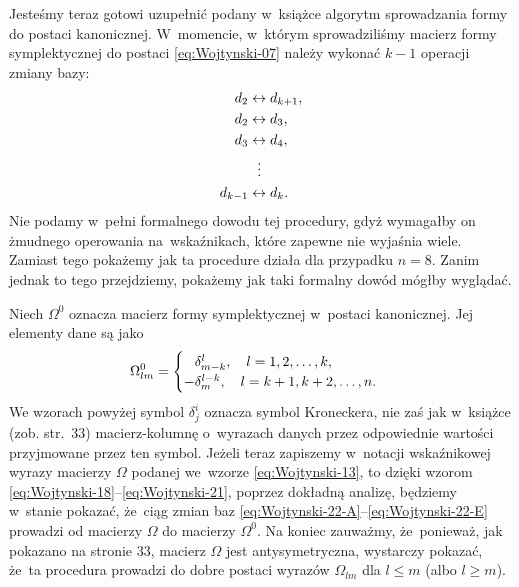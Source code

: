 \documentclass[a4paper,11pt]{article}
\numberwithin{equation}{section}
\begin{document}
Jesteśmy teraz gotowi uzupełnić podany w~książce algorytm sprowadzania
formy do postaci kanonicznej. W~momencie, w~którym sprowadziliśmy macierz
formy symplektycznej do postaci \eqref{eq:Wojtynski-07} należy wykonać
$k - 1$ operacji zmiany bazy:
\begin{subequations}
  \begin{align}
    \label{eq:Wojtynski-22-A}
    d_{ 2 } &\leftrightarrow d_{ k + 1 }, \\
    \label{eq:Wojtynski-22-B}
    d_{ 2 } &\leftrightarrow d_{ 3 }, \\
    \label{eq:Wojtynski-22-C}
    d_{ 3 } &\leftrightarrow d_{ 4 }, \\
    \label{eq:Wojtynski-22-D}
    &\hspace{0.65em} \vdots \\
    \label{eq:Wojtynski-22-E}
    d_{ k - 1 } &\leftrightarrow d_{ k }.
  \end{align}
\end{subequations}
Nie podamy w~pełni formalnego dowodu tej procedury, gdyż wymagałby on
żmudnego operowania na~wskaźnikach, które zapewne nie wyjaśnia wiele.
Zamiast tego pokażemy jak ta procedure działa dla przypadku $n = 8$.
Zanim jednak to tego przejdziemy, pokażemy jak taki formalny dowód mógłby
wyglądać.

Niech $\Omega^{ 0 }$ oznacza macierz formy symplektycznej w~postaci kanonicznej.
Jej elementy dane są jako
\begin{equation}
  \label{eq:Wojtynski-23}
  \Omega^{ 0 }_{ l m } =
  \begin{cases}
    \hphantom{-} \delta^{ l }_{ m - k }, \quad l = 1, 2, \ldots, k, \\
    -\delta^{ l - k }_{ m }, \quad l = k + 1, k + 2, \ldots, n.
  \end{cases}
\end{equation}
We wzorach powyżej symbol $\delta^{ i }_{ j }$ oznacza symbol Kroneckera, nie zaś
jak w~książce (zob. str.~33) macierz-kolumnę o~wyrazach danych przez
odpowiednie wartości przyjmowane przez ten symbol. Jeżeli teraz zapiszemy
w~notacji wskaźnikowej wyrazy macierzy $\Omega$ podanej we~wzorze
\eqref{eq:Wojtynski-13}, to dzięki wzorom
\eqref{eq:Wojtynski-18}--\eqref{eq:Wojtynski-21}, poprzez
dokładną analizę, będziemy w~stanie pokazać, że~ciąg zmian baz
\eqref{eq:Wojtynski-22-A}--\eqref{eq:Wojtynski-22-E} prowadzi od macierzy
$\Omega$ do macierzy $\Omega^{ 0 }$. Na koniec zauważmy, że~ponieważ, jak pokazano na
stronie 33, macierz $\Omega$ jest antysymetryczna, wystarczy pokazać, że~ta
procedura prowadzi do dobre postaci wyrazów $\Omega_{ l m }$ dla $l \leq m$ (albo
$l \geq m$).
\end{document}
